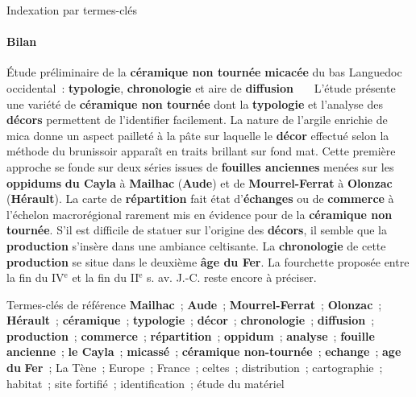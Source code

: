   \begin{frame}{Indexation par termes-clés}\framesubtitle{Bilan}
    \vspace{-.33em}
    \begin{exampleblock}{\small
      Étude préliminaire de la \textbf{céramique non tournée}
      \textbf{micacée} du bas Languedoc occidental~: \textbf{typologie},
      \textbf{chronologie} et aire de \textbf{diffusion}
    }\justifying\small
      ~~~L'étude présente une variété de \textbf{céramique non tournée} dont la
      \textbf{typologie} et l'analyse des \textbf{décors} permettent de
      l'identifier facilement. La nature de l'argile enrichie de mica donne un
      aspect pailleté à la pâte sur laquelle le \textbf{décor} effectué selon
      la méthode du brunissoir apparaît en traits brillant sur fond mat. Cette
      première approche se fonde sur deux séries issues de \textbf{fouilles
      anciennes} menées sur les \textbf{oppidums} \textbf{du Cayla} à
      \textbf{Mailhac} (\textbf{Aude}) et de \textbf{Mourrel-Ferrat} à
      \textbf{Olonzac} (\textbf{Hérault}). La carte de
      \textbf{répartition} fait état d'\textbf{échanges} ou de
      \textbf{commerce} à l'échelon macrorégional rarement mis en évidence pour
      de la \textbf{céramique non tournée}. S'il est difficile de statuer sur
      l'origine des \textbf{décors}, il semble que la \textbf{production}
      s'insère dans une ambiance celtisante. La \textbf{chronologie} de cette
      \textbf{production} se situe dans le deuxième \textbf{âge du Fer}. La
      fourchette proposée entre la fin du IV$^\text{e}$ et la fin du II$^\text{e}$
      s. av. J.-C. reste encore à préciser.

      \begin{exampleblock}{\small Termes-clés de référence}\justifying\small
        \textbf{Mailhac}~; \textbf{Aude}~; \textbf{Mourrel-Ferrat}~;
        \textbf{Olonzac}~; \textbf{Hérault}~; \textbf{céramique}~;
        \textbf{typologie}~; \textbf{décor}~; \textbf{chronologie}~;
        \textbf{diffusion}~; \textbf{production}~; \textbf{commerce}~;
        \textbf{répartition}~; \textbf{oppidum}~; \textbf{analyse}~;
        \textbf{fouille ancienne}~; \textbf{le Cayla}~;
        \textbf{micassé}~; \textbf{céramique non-tournée}~;
        \textbf{echange}~; \textbf{age du} \textbf{Fer}~; La Tène~;
        Europe~; France~; celtes~; distribution~; cartographie~; habitat~; site
        fortifié~; identification~; étude du matériel
      \end{exampleblock}
    \end{exampleblock}
  \end{frame}
